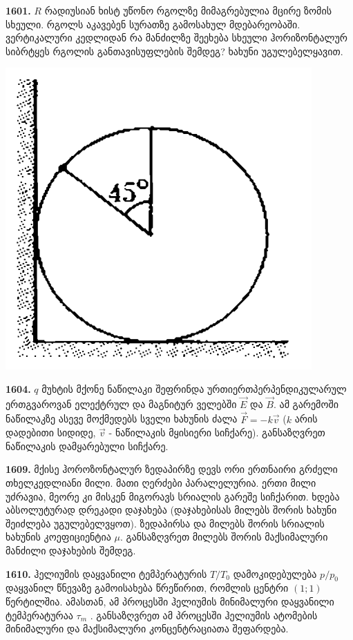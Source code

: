 \documentclass[12pt,a4paper,]{report}
\begin{document}
\textbf{1601.} $R$ რადიუსიან ხისტ უწონო რგოლზე მიმაგრებულია მცირე ზომის სხეული. რგოლს აკავებენ სურათზე გამოსახულ მდებარეობაში. ვერტიკალური კედლიდან რა მანძილზე შეეხება სხეული ჰორიზონტალურ სიბრტყეს რგოლის განთავისუფლების შემდეგ? ხახუნი უგულებელყავით.               
		\begin{center}
			\includegraphics[scale=0.4]{images/F1601.png}
		\end{center}

\textbf{1604.} $q$ მუხტის მქონე ნაწილაკი შეფრინდა ურთიერთპერპენდიკულარულ ერთგვაროვან ელექტრულ და მაგნიტურ ველებში $\vec{E}$ და $\vec{B}$. ამ გარემოში ნაწილაკზე ასევე მოქმედებს სველი ხახუნის ძალა $\vec{F} = - k\vec{v}$ ($k$ არის დადებითი სიდიდე, $\vec{v}$ - ნაწილაკის მყისიერი სიჩქარე). განსაზღვრეთ ნაწილაკის დამყარებული სიჩქარე. 
	
\textbf{1609.} მქისე ჰოროზონტალურ ზედაპირზე დევს ორი ერთნაირი გრძელი თხელკედლიანი მილი. მათი ღერძები პარალელურია. ერთი მილი უძრავია, მეორე კი მისკენ მიგორავს სრიალის გარეშე სიჩქარით. ხდება აბსოლუტურად დრეკადი დაჯახება (დაჯახებისას მილებს შორის ხახუნი შეიძლება უგულებელვყოთ). ზედაპირსა და მილებს შორის სრიალის ხახუნის კოეფიციენტია $\mu$. განსაზღვრეთ მილებს შორის მაქსიმალური მანძილი დაჯახების შემდეგ.

\textbf{1610.} ჰელიუმის  დაყვანილი ტემპერატურის $T/T_0$ დამოკიდებულება $p/p_0$ დაყვანილ წნევაზე გამოისახება წრეწირით, რომლის ცენტრი $(1; 1)$ წერტილშია. ამასთან, ამ პროცესში ჰელიუმის მინიმალური დაყვანილი ტემპერატურაა $\tau_m$ . განსაზღვრეთ ამ პროცესში ჰელიუმის ატომების მინიმალური და მაქსიმალური კონცენტრაციათა შეფარდება.
\end{document}
